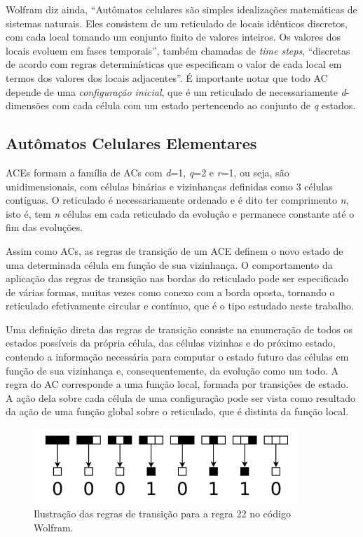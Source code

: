 \documentclass[a4paper,12pt]{ltxdoc}
\newcommand\tab[1][1cm]{\hspace*{#1}}
\begin{document}
\tab Wolfram diz ainda, ``Autômatos celulares são simples idealizações matemáticas de sistemas naturais. Eles consistem de um reticulado de locais idênticos discretos, com cada local tomando um conjunto finito de valores inteiros. Os valores dos locais evoluem em fases temporais'', também chamadas de \textit{time steps}, ``discretas de acordo com regras determinísticas que especificam o valor de cada local em termos dos valores dos locais adjacentes''. É importante notar que todo AC depende de uma \textit{configuração inicial}, que é um reticulado de necessariamente \textit{d}-dimensões com cada célula com um estado pertencendo ao conjunto de \textit{q} estados.

\subsection{Autômatos Celulares Elementares} \label{ref_ace}

ACEs formam a família de ACs com \textit{d}=1, \textit{q}=2 e \textit{r}=1, ou seja, são unidimensionais, com células binárias e vizinhanças definidas como 3 células contíguas. O reticulado é necessariamente ordenado e é dito ter comprimento \textit{n}, isto é, tem \textit{n} células em cada reticulado da evolução e permanece constante até o fim das evoluções.

\tab Assim como ACs, as regras de transição de um ACE definem o novo estado de uma determinada célula em função de sua vizinhança. O comportamento da aplicação das regras de transição nas bordas do reticulado pode ser especificado de várias formas, muitas vezes como conexo com a borda oposta, tornando o reticulado efetivamente circular e contínuo, que é o tipo estudado neste trabalho.

\tab Uma definição direta das regras de transição consiste na enumeração de todos os estados possíveis da própria célula, das células vizinhas e do próximo estado, contendo a informação necessária para computar o estado futuro das células em função de sua vizinhança e, consequentemente, da evolução como um todo. A regra do AC corresponde a uma função local, formada por transições de estado. A ação dela sobre cada célula de uma configuração pode ser vista como resultado da ação de uma função global sobre o reticulado, que é distinta da função local.

\begin{figure}[!htbp]
  \centerline{\includegraphics[width=10cm]{imgs/rule_22.png}}
  \caption{Ilustração das regras de transição para a regra 22 no código Wolfram. }
\end{figure}
\end{document}
